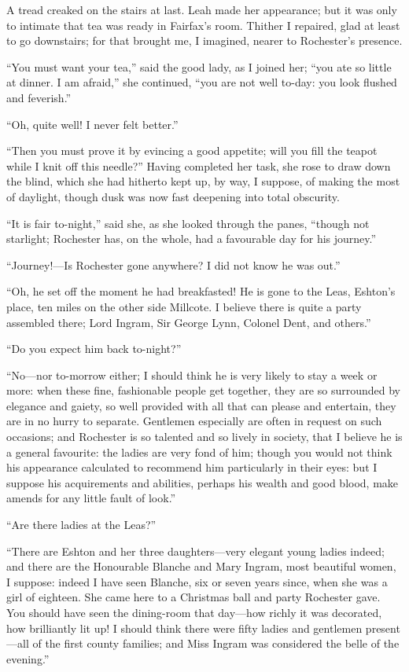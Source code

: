 A tread creaked on the stairs at last.  Leah made her appearance; but it
was only to intimate that tea was ready in \Mrs{} Fairfax's room.  Thither
I repaired, glad at least to go downstairs; for that brought me, I
imagined, nearer to \Mr{} Rochester's presence.

\enquote{You must want your tea,} said the good lady, as I joined her;
\enquote{you ate so little at dinner.  I am afraid,} she continued,
\enquote{you are not well to-day: you look flushed and feverish.}

\enquote{Oh, quite well!  I never felt better.}

\enquote{Then you must prove it by evincing a good appetite; will you
	fill the teapot while I knit off this needle?}  Having completed her
task, she rose to draw down the blind, which she had hitherto kept up,
by way, I suppose, of making the most of daylight, though dusk was now
fast deepening into total obscurity.

\enquote{It is fair to-night,} said she, as she looked through the
panes, \enquote{though not starlight; \Mr{} Rochester has, on the whole,
	had a favourable day for his journey.}

\enquote{Journey!---Is \Mr{} Rochester gone anywhere?  I did not know he
	was out.}

\enquote{Oh, he set off the moment he had breakfasted!  He is gone to
	the Leas, \Mr{} Eshton's place, ten miles on the other side Millcote.  I
	believe there is quite a party assembled there; Lord Ingram, Sir George
	Lynn, Colonel Dent, and others.}

\enquote{Do you expect him back to-night?}

\enquote{No---nor to-morrow either; I should think he is very likely to
	stay a week or more: when these fine, fashionable people get together,
	they are so surrounded by elegance and gaiety, so well provided with all
	that can please and entertain, they are in no hurry to separate.
	Gentlemen especially are often in request on such occasions; and \Mr{}
	Rochester is so talented and so lively in society, that I believe he is
	a general favourite: the ladies are very fond of him; though you would
	not think his appearance calculated to recommend him particularly in
	their eyes: but I suppose his acquirements and abilities, perhaps his
	wealth and good blood, make amends for any little fault of look.}

\enquote{Are there ladies at the Leas?}

\enquote{There are \Mrs{} Eshton and her three daughters---very elegant
	young ladies indeed; and there are the Honourable Blanche and Mary
	Ingram, most beautiful women, I suppose: indeed I have seen Blanche, six
	or seven years since, when she was a girl of eighteen.  She came here to
	a Christmas ball and party \Mr{} Rochester gave.  You should have seen the
	dining-room that day---how richly it was decorated, how brilliantly lit
	up!  I should think there were fifty ladies and gentlemen present---all
	of the first county families; and Miss Ingram was considered the belle
	of the evening.}


